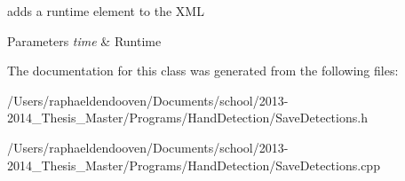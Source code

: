 adds a runtime element to the X\-M\-L 


\begin{DoxyParams}{Parameters}
{\em time} & Runtime \\
\hline
\end{DoxyParams}


The documentation for this class was generated from the following files\-:\begin{DoxyCompactItemize}
\item 
/\-Users/raphaeldendooven/\-Documents/school/2013-\/2014\-\_\-\-Thesis\-\_\-\-Master/\-Programs/\-Hand\-Detection/Save\-Detections.\-h\item 
/\-Users/raphaeldendooven/\-Documents/school/2013-\/2014\-\_\-\-Thesis\-\_\-\-Master/\-Programs/\-Hand\-Detection/Save\-Detections.\-cpp\end{DoxyCompactItemize}
